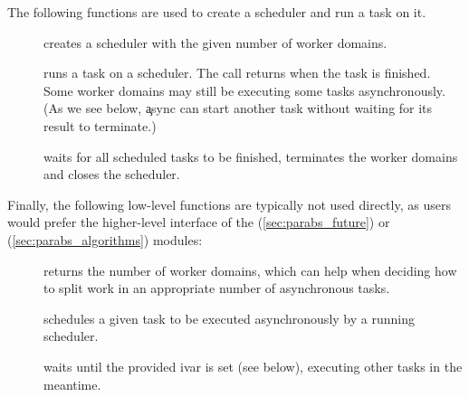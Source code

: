 \noindent
The following functions are used to create a scheduler and run a task on it.
\begin{description}
\item[] creates a scheduler
  with the given number of worker domains.

\item[] runs a task on
  a scheduler. The call returns when the task is finished. Some worker
  domains may still be executing some tasks asynchronously. (As we see below,
  \c{async} can start another task without waiting for its result to
  terminate.)

\item[] waits for all scheduled
  tasks to be finished, terminates the worker domains and closes the
  scheduler.
\end{description}

\noindent
Finally, the following low-level functions are typically not used
directly, as users would prefer the higher-level interface of the
 (\cref{sec:parabs_future}) or 
(\cref{sec:parabs_algorithms}) modules:
\begin{description}
\item[] returns the number of
  worker domains, which can help when deciding how to split work in an
  appropriate number of asynchronous tasks.

\item[] schedules
  a given task to be executed asynchronously by a running scheduler.

\item[]
  waits until the provided ivar is set (see below), executing other tasks in the meantime.
\end{description}

